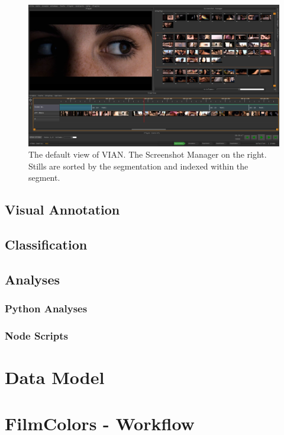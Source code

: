 \documentclass[11pt, a4paper,oneside,chapterprefix=false]{scrbook}
\begin{document}
\begin{figure}[htp]
	\centering
	\includegraphics[width=1.0\textwidth]{figures/screenshots.png}
	\caption{The default view of VIAN. The Screenshot Manager on the right. Stills are sorted by the segmentation and indexed within the segment.}
	\label{fig:histogram3d}
\end{figure}

\subsection{Visual Annotation}

\subsection{Classification}
\subsection{Analyses}
\subsubsection{Python Analyses}
\subsubsection{Node Scripts}

\section{Data Model} \label{chp:data_model}


\section{FilmColors - Workflow} \label{chp:workflow}
\end{document}
